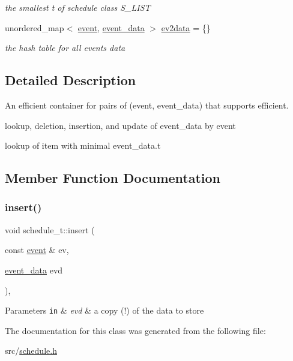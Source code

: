 \begin{DoxyCompactItemize}
\begin{DoxyCompactList}\small\item\em the smallest t of schedule class S\+\_\+\+L\+I\+ST \end{DoxyCompactList}\item 
\mbox{\label{classschedule__t_aaffcb55e6a97d302acdd1c4723af1a45}} 
unordered\+\_\+map$<$ \hyperlink{structtricl_1_1event}{event}, \hyperlink{structtricl_1_1event__data}{event\+\_\+data} $>$ \hyperlink{classschedule__t_aaffcb55e6a97d302acdd1c4723af1a45}{ev2data} = \{\}
\begin{DoxyCompactList}\small\item\em the hash table for all events\textquotesingle{} data \end{DoxyCompactList}\end{DoxyCompactItemize}


\subsection{Detailed Description}
An efficient container for pairs of (event, event\+\_\+data) that supports efficient. 


\begin{DoxyItemize}
\item lookup, deletion, insertion, and update of event\+\_\+data by event
\item lookup of item with minimal event\+\_\+data.\+t 
\end{DoxyItemize}

\subsection{Member Function Documentation}
\mbox{\label{classschedule__t_ac103ad35f9b65078b79746a504f82287}} 
\subsubsection{\texorpdfstring{insert()}{insert()}}
{\footnotesize\ttfamily void schedule\+\_\+t\+::insert (\begin{DoxyParamCaption}\item[{const \hyperlink{structtricl_1_1event}{event} \&}]{ev,  }\item[{\hyperlink{structtricl_1_1event__data}{event\+\_\+data}}]{evd }\end{DoxyParamCaption})\hspace{0.3cm}{\ttfamily [inline]}, {\ttfamily [private]}}


\begin{DoxyParams}[1]{Parameters}
\mbox{\tt in}  & {\em evd} & a copy (!) of the data to store \\
\hline
\end{DoxyParams}


The documentation for this class was generated from the following file\+:\begin{DoxyCompactItemize}
\item 
src/\hyperlink{schedule_8h}{schedule.\+h}\end{DoxyCompactItemize}
